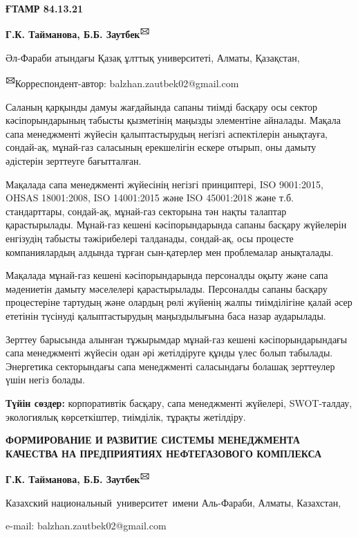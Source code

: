 {\bfseries ҒТАМР 84.13.21}


\begin{center}
{\bfseries Г.К. Тайманова, Б.Б. Заутбек\textsuperscript{🖂}}

Әл-Фараби атындағы Қазақ ұлттық университеті, Алматы, Қазақстан,

{\bfseries \textsuperscript{🖂}}Корреспондент-автор:
balzhan.zautbek02@gmail.com
\end{center}

Саланың қарқынды дамуы жағдайында сапаны тиімді басқару осы сектор
кәсіпорындарының табысты қызметінің маңызды элементіне айналады. Мақала
сапа менеджменті жүйесін қалыптастырудың негізгі аспектілерін анықтауға,
сондай-ақ, мұнай-газ саласының ерекшелігін ескере отырып, оны дамыту
әдістерін зерттеуге бағытталған.

Мақалада сапа менеджменті жүйесінің негізгі принциптері, ISO 9001:2015,
OHSAS 18001:2008, ISO 14001:2015 және ISO 45001:2018 және т.б.
стандарттары, сондай-ақ, мұнай-газ секторына тән нақты талаптар
қарастырылады. Мұнай-газ кешені кәсіпорындарында сапаны басқару
жүйелерін енгізудің табысты тәжірибелері талданады, сондай-ақ, осы
процесте компаниялардың алдында тұрған сын-қатерлер мен проблемалар
анықталады.

Мақалада мұнай-газ кешені кәсіпорындарында персоналды оқыту және сапа
мәдениетін дамыту мәселелері қарастырылады. Персоналды сапаны басқару
процестеріне тартудың және олардың рөлі жүйенің жалпы тиімділігіне қалай
әсер ететінін түсінуді қалыптастырудың маңыздылығына баса назар
аударылады.

Зерттеу барысында алынған тұжырымдар мұнай-газ кешені кәсіпорындарындағы
сапа менеджменті жүйесін одан әрі жетілдіруге құнды үлес болып табылады.
Энергетика секторындағы сапа менеджменті саласындағы болашақ зерттеулер
үшін негіз болады.

{\bfseries Түйін сөздер:} корпоративтік басқару, сапа менеджменті жүйелері,
SWOT-талдау, экологиялық көрсеткіштер, тиімділік, тұрақты жетілдіру.

\begin{center}
{\large\bfseries ФОРМИРОВАНИЕ И РАЗВИТИЕ СИСТЕМЫ МЕНЕДЖМЕНТА КАЧЕСТВА НА
ПРЕДПРИЯТИЯХ НЕФТЕГАЗОВОГО КОМПЛЕКСА}

{\bfseries Г.К. Тайманова, Б.Б. Заутбек\textsuperscript{🖂}}

Казахский национальный~университет~имени Аль-Фараби, Алматы, Казахстан,

e-mail: balzhan.zautbek02@gmail.com
\end{center}


